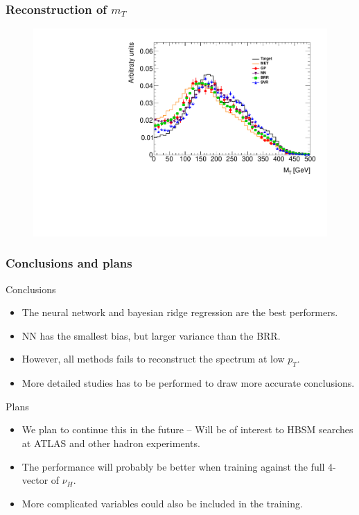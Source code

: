 \documentclass[9pt, lualatex]{beamer}
\begin{document}
\begin{frame}
    \frametitle{Reconstruction of $m_T$}

    \begin{figure}
        \centering
        \includegraphics[width=.7\textwidth]{plots/mt.pdf}
    \end{figure}
\end{frame}

\begin{frame}
    \frametitle{Conclusions and plans}

    Conclusions
    \begin{itemize}
        \item The neural network and bayesian ridge regression are the best performers.
        \item NN has the smallest bias, but larger variance than the BRR.
        \item However, all methods fails to reconstruct the spectrum at low $p_T$.
        \item More detailed studies has to be performed to draw more accurate conclusions.
    \end{itemize}

    \vfill

    Plans
    \begin{itemize}
        \item We plan to continue this in the future -- Will be of interest to HBSM searches at ATLAS and other hadron experiments.
        \item The performance will probably be better when training against the full 4-vector of $\nu_H$.
        \item More complicated variables could also be included in the training.
    \end{itemize}
\end{frame}
\end{document}
